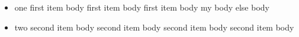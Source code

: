 \begin{itemize}
	\item one
	      first item body
	      first item body
	      first item body
	      \ifnum
		      my body
	      \else
		      else body
	      \fi
	\item two
	      second item body
	      second item body
	      second item body
	      second item body
\end{itemize}
